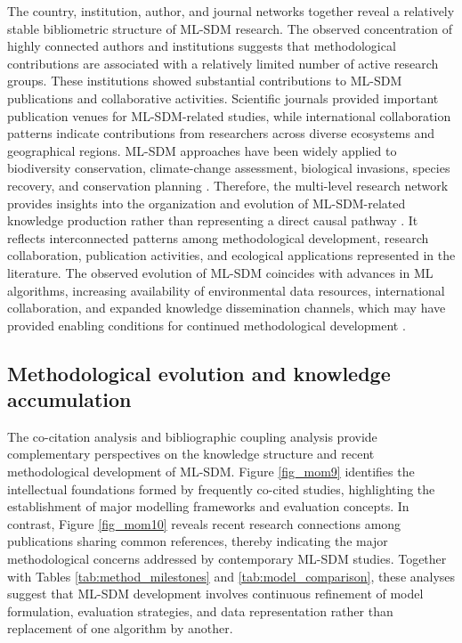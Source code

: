 \documentclass[authoryear,preprint,review,12pt]{elsarticle}
\begin{document}
The country, institution, author, and journal networks together reveal a relatively stable bibliometric structure of ML-SDM research. The observed concentration of highly connected authors and institutions suggests that methodological contributions are associated with a relatively limited number of active research groups. These institutions showed substantial contributions to ML-SDM publications and collaborative activities. Scientific journals provided important publication venues for ML-SDM-related studies, while international collaboration patterns indicate contributions from researchers across diverse ecosystems and geographical regions. ML-SDM approaches have been widely applied to biodiversity conservation, climate-change assessment, biological invasions, species recovery, and conservation planning \citep{guisan2005predicting, elith2009species, franklin2013species}. Therefore, the multi-level research network provides insights into the organization and evolution of ML-SDM-related knowledge production rather than representing a direct causal pathway \citep{chen2017science, zupic2015bibliometric, donthu2021conduct}. It reflects interconnected patterns among methodological development, research collaboration, publication activities, and ecological applications represented in the literature. The observed evolution of ML-SDM coincides with advances in ML algorithms, increasing availability of environmental data resources, international collaboration, and expanded knowledge dissemination channels, which may have provided enabling conditions for continued methodological development \citep{telenius2011biodiversity, fick2017worldclim, reichstein2019deep}.

\subsection{Methodological evolution and knowledge accumulation}

The co-citation analysis and bibliographic coupling analysis provide complementary perspectives on the knowledge structure and recent methodological development of ML-SDM. Figure \ref{fig_mom9} identifies the intellectual foundations formed by frequently co-cited studies, highlighting the establishment of major modelling frameworks and evaluation concepts. In contrast, Figure \ref{fig_mom10} reveals recent research connections among publications sharing common references, thereby indicating the major methodological concerns addressed by contemporary ML-SDM studies. Together with Tables \ref{tab:method_milestones} and \ref{tab:model_comparison}, these analyses suggest that ML-SDM development involves continuous refinement of model formulation, evaluation strategies, and data representation rather than replacement of one algorithm by another.
\end{document}
